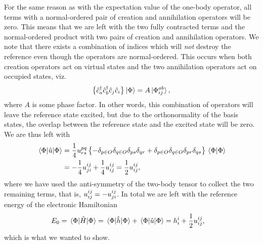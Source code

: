         For the same reason as with the expectation value of the one-body
        operator, all terms with a normal-ordered pair of creation and
        annihilation operators will be zero.
        This means that we are left with the two fully contracted terms and the
        normal-ordered product with two pairs of creation and annihilation
        operators.
        We note that there exists a combination of indices which will \emph{not}
        destroy the reference even though the operators are normal-ordered.
        This occurs when both creation operators act on virtual states and the
        two annihilation operators act on occupied states, viz.
        \begin{align}
            \bigl\{ 
                {\hat{c}_{a}^{\dagger}}
                {\hat{c}_{b}^{\dagger}}
                {\hat{c}_{j}}
                {\hat{c}_{i}}
             \bigr\}
            \ket*{\Phi}
            = A\ket*{\Phi^{ab}_{ij}},
        \end{align}
        where $A$ is some phase factor.
        In other words, this combination of operators will leave the reference
        state excited, but due to the orthonormality of the basis states, the
        overlap between the reference state and the excited state will be zero.
        We are thus left with
        \begin{align}
            \mel*{\Phi}{\hat{u}}{\Phi}
            &=
            \frac{1}{4}u^{pq}_{rs}\left\{ 
                -\delta_{p \in O}
                \delta_{q \in O}
                \delta_{ps}
                \delta_{qr}
                + \delta_{p \in O}
                \delta_{q \in O}
                \delta_{pr}
                \delta_{qs}
             \right\}\braket*{\Phi}{\Phi}
            \\
            &=
            -\frac{1}{4} u^{ij}_{ji}
            + \frac{1}{4} u^{ij}_{ij}
            = \frac{1}{2} u^{ij}_{ij},
        \end{align}
        where we have used the anti-symmetry of the two-body tensor to collect the
        two remaining terms, that is, $u^{ij}_{ij} =-u^{ij}_{ji}$.
        In total we are left with the reference energy of the electronic
        Hamiltonian
        \begin{align}
            E_{0}
            &=
            \mel*{\Phi}{\hat{H}}{\Phi}
            =
            \mel*{\Phi}{\hat{h}}{\Phi}
            + \mel*{\Phi}{\hat{u}}{\Phi}
            =
            h^{i}_{i}
            + \frac{1}{2} u^{ij}_{ij},
        \end{align}
        which is what we wanted to show.

